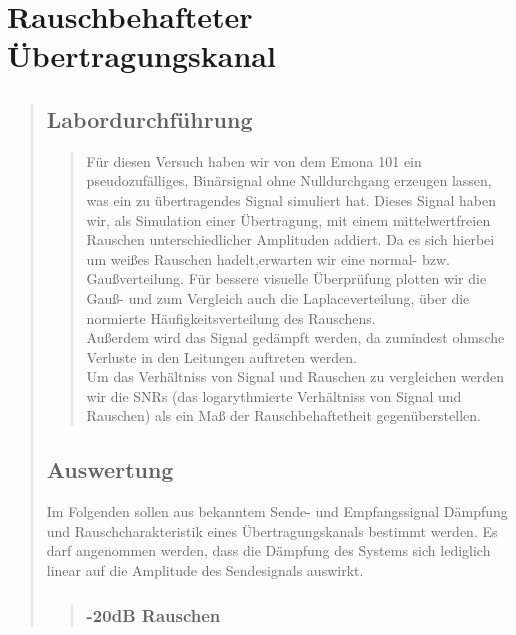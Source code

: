 \section{Rauschbehafteter Übertragungskanal}
\begin{quote}
    
    
    \subsection{Labordurchführung}
    \begin{quote}
        Für diesen Versuch haben wir von dem Emona 101 ein pseudozufälliges, Binärsignal ohne Nulldurchgang erzeugen lassen, was
        ein zu übertragendes Signal simuliert hat. Dieses Signal haben wir, als Simulation einer Übertragung, mit einem
        mittelwertfreien Rauschen unterschiedlicher Amplituden addiert. Da es sich hierbei um weißes Rauschen hadelt,erwarten wir
        eine normal- bzw. Gaußverteilung. Für bessere visuelle Überprüfung plotten wir die Gauß- und zum Vergleich auch die
        Laplaceverteilung, über die normierte Häufigkeitsverteilung des Rauschens.\\
        Außerdem wird das Signal gedämpft werden, da zumindest ohmsche Verluste in den Leitungen auftreten werden.\\
        Um das Verhältniss von Signal und Rauschen zu vergleichen werden wir die SNRs (das logarythmierte Verhältniss von Signal
        und Rauschen) als ein Maß der Rauschbehaftetheit gegenüberstellen.
        
        
    \end{quote}
    
    
    
    
    \subsection{Auswertung}
    
    Im Folgenden sollen aus bekanntem Sende- und Empfangssignal Dämpfung und Rauschcharakteristik
    eines Übertragungskanals bestimmt werden. Es darf angenommen werden, dass die Dämpfung des
    Systems sich lediglich linear auf die Amplitude des Sendesignals auswirkt.
    
    \begin{quote}
        
        \subsubsection{-20dB Rauschen}
        \begin{quote}
            

\end{quote}
\end{quote}
\end{quote}
